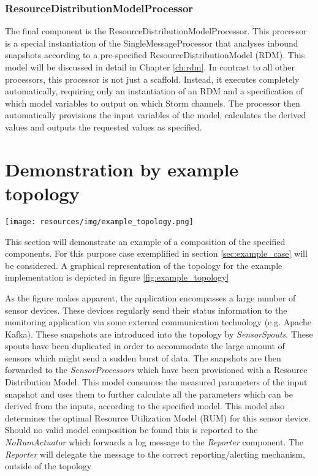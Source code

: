 \subsubsection*{ResourceDistributionModelProcessor}
The final component is the ResourceDistributionModelProcessor. This processor is a special instantiation of the SingleMessageProcessor that analyses inbound snapshots according to a pre-specified ResourceDistributionModel (RDM). This model will be discussed in detail in Chapter \ref{ch:rdm}. In contrast to all other processors, this processor is not just a scaffold. Instead, it executes completely automatically, requiring only an instantiation of an RDM and a specification of which model variables to output on which Storm channels. The processor then automatically provisions the input variables of the model, calculates the derived values and outputs the requested values as specified.

\section{Demonstration by example topology}
\label{sec:example_application_topology}

\begin{sidewaysfigure}
\centering
\texttt{[image: resources/img/example\_topology.png]}
\caption{Example topology of a platform implementation according to the example case}
\label{fig:example_topology}
\end{sidewaysfigure}

This section will demonstrate an example of a composition of the specified components. For this purpose case exemplified in section \ref{sec:example_case} will be considered. A graphical representation of the topology for the example implementation is depicted in figure \ref{fig:example_topology}

As the figure makes apparent, the application encompasses a large number of sensor devices. These devices regularly send their status information to the monitoring application via some external communication technology (e.g. Apache Kafka). These snapshots are introduced into the topology by \emph{SensorSpouts}. These spouts have been duplicated in order to accommodate the large amount of sensors which might send a sudden burst of data. The snapshots are then forwarded to the \emph{SensorProcessors} which have been provisioned with a Resource Distribution Model. This model consumes the measured parameters of the input snapshot and uses them to further calculate all the parameters which can be derived from the inputs, according to the specified model. This model also determines the optimal Resource Utilization Model (RUM) for this sensor device. Should no valid model composition be found this is reported to the \emph{NoRumActuator} which forwards a log message to the \emph{Reporter} component. The \emph{Reporter} will delegate the message to the correct reporting/alerting mechanism, outside of the topology

